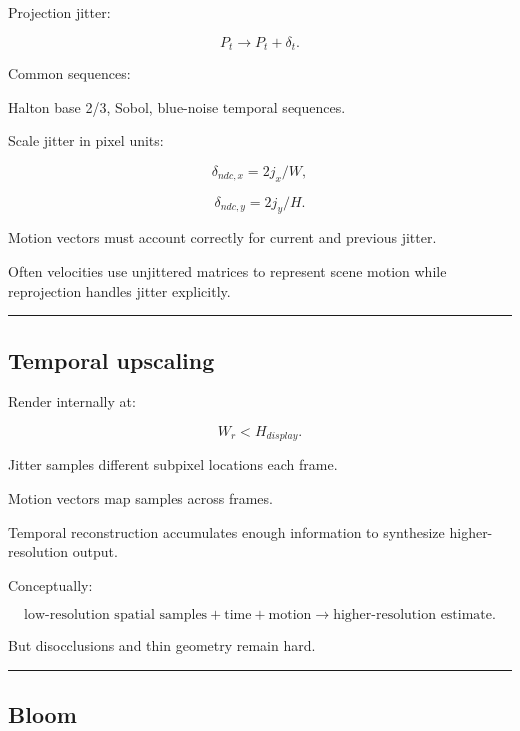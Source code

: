 Projection jitter:

\[
P_t
\rightarrow
P_t+\delta_t.
\]

Common sequences:

Halton base 2/3, Sobol, blue-noise temporal sequences.

Scale jitter in pixel units:

\[
\delta_{ndc,x}
=
2j_x/W,
\]

\[
\delta_{ndc,y}
=
2j_y/H.
\]

Motion vectors must account correctly for current and previous jitter.

Often velocities use unjittered matrices to represent scene motion while reprojection handles jitter explicitly.

\begin{center}\rule{0.5\linewidth}{0.5pt}\end{center}

\subsection{Temporal upscaling}\label{04-visual-computing-ii-ch040-temporal-upscaling}

\hypertarget{04-visual-computing-ii-ch040-temporal-upscaling}{}

Render internally at:

\[
W_r<H_{display}.
\]

Jitter samples different subpixel locations each frame.

Motion vectors map samples across frames.

Temporal reconstruction accumulates enough information to synthesize higher-resolution output.

Conceptually:

\[
\boxed{
\text{low-resolution spatial samples}
+
\text{time}
+
\text{motion}
\rightarrow
\text{higher-resolution estimate}.
}
\]

But disocclusions and thin geometry remain hard.

\begin{center}\rule{0.5\linewidth}{0.5pt}\end{center}

\subsection{Bloom}\label{04-visual-computing-ii-ch040-bloom}

\hypertarget{04-visual-computing-ii-ch040-bloom}{}

